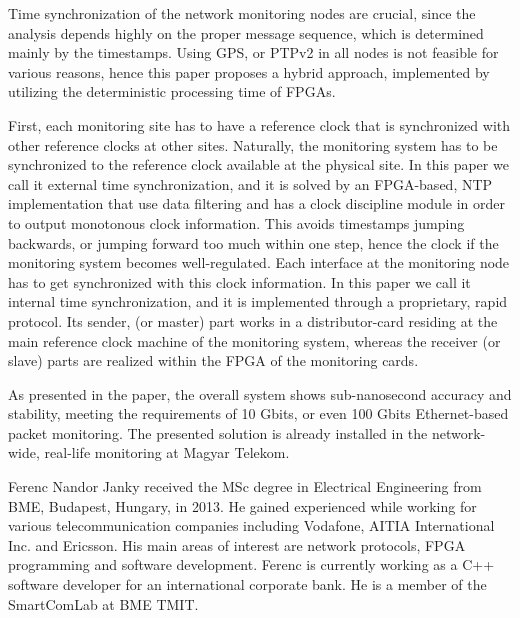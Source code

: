 \documentclass[journal]{IEEEtran}
\begin{document}
Time synchronization of the network monitoring nodes are crucial, since the analysis depends highly on the proper message sequence, which is determined mainly by the timestamps. Using GPS, or PTPv2 in all nodes is not feasible for various reasons, hence this paper proposes a hybrid approach, implemented by utilizing the deterministic processing time of FPGAs.

First, each monitoring site has to have a reference clock that is synchronized with other reference clocks at other sites. Naturally, the monitoring system has to be synchronized to the reference clock available at the physical site. In this paper we call it external time synchronization, and it is solved by an FPGA-based, NTP implementation that use data filtering and has a clock discipline module in order to output monotonous clock information. This avoids timestamps jumping backwards, or jumping forward too much within one step, hence the clock if the monitoring system becomes well-regulated. Each interface at the monitoring node has to get synchronized with this clock information. In this paper we call it internal time synchronization, and it is implemented through a proprietary, rapid protocol. Its sender, (or master) part works in a distributor-card residing at the main reference clock machine of the monitoring system, whereas the receiver (or slave) parts are realized within the FPGA of the monitoring cards.

As presented in the paper, the overall system shows sub-nanosecond accuracy and stability, meeting the requirements of 10 Gbit\/s, or even 100 Gbit\/s Ethernet-based packet monitoring. The presented solution is already installed in the network-wide, real-life monitoring at Magyar Telekom.





\begin{IEEEbiography}{Ferenc Nandor Janky} 
received the MSc degree in Electrical Engineering from BME, Budapest, Hungary, in 2013.
He gained experienced while working for various telecommunication companies including Vodafone, AITIA International Inc. and Ericsson.
His main areas of interest are network protocols, FPGA programming and software development. 
Ferenc is currently working as a C++ software developer for an international corporate bank. He is a member of the SmartComLab at BME TMIT.
\end{IEEEbiography}
\end{document}
